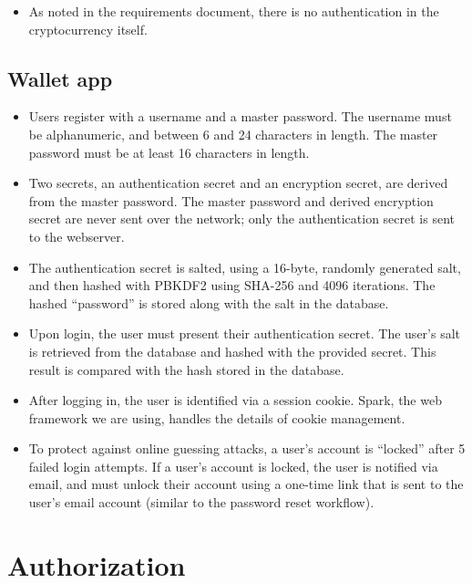 \documentclass[a4paper,12pt]{article}
\begin{document}
\begin{itemize}
	\item As noted in the requirements document, there is no authentication in the cryptocurrency itself.
\end{itemize}

\subsection{Wallet app}

\begin{itemize}
	\item Users register with a username and a master password. The username must be alphanumeric, and between 6 and 24 characters in length.
	The master password must be at least 16 characters in length.
  \item Two secrets, an authentication secret and an encryption secret, are derived from the master password.
  The master password and derived encryption secret are never sent over the network; only the authentication secret is sent to the webserver.
	\item The authentication secret is salted, using a 16-byte, randomly generated salt, and then hashed with PBKDF2 using SHA-256 and 4096 iterations.
	The hashed ``password'' is stored along with the salt in the database.
	\item Upon login, the user must present their authentication secret. The user's salt is retrieved from the database and hashed with the provided secret.
	This result is compared with the hash stored in the database.
	\item After logging in, the user is identified via a session cookie.
	Spark, the web framework we are using, handles the details of cookie management. %
	\item To protect against online guessing attacks, a user's account is ``locked'' after 5 failed login attempts.
	If a user's account is locked, the user is notified via email, and must unlock their account using a one-time link that is sent to the user's email account (similar to the password reset workflow).
\end{itemize}


\section{Authorization}
\end{document}
